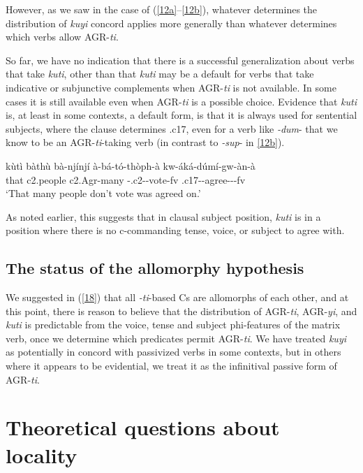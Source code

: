 \documentclass[output=paper,
modfonts
]{langscibook}
\begin{document}
However, as we saw in the case of (\ref{12a}--\ref{12b}), whatever determines the distribution of \textit{kuyi} concord applies more generally than whatever determines which verbs allow AGR-\textit{ti}.

So far, we have no indication that there is a successful generalization about verbs that take \textit{kuti}, other than that \textit{kuti} may be a default for verbs that take indicative or subjunctive complements when AGR-\textit{ti} is not available. In some cases it is still available even when AGR-\textit{ti} is a possible choice. Evidence that \textit{kuti} is, at least in some contexts, a default form, is that it is always used for sentential subjects, where the clause determines .c17, even for a verb like \textit{-dum}- that we know to be an AGR-\textit{ti}-taking verb (in contrast to \textit{-sup}- in \ref{12b}).

\ea\label{n23} \gll kùtì bàthù bà-njínjí à-bá-tó-thòph-à kw-áká-dúmí-gw-àn-à\\
      that c2.people c2.Agr-many -.c2--vote-fv .c17--agree---fv\\
	\glt `That many people don't vote was agreed on.' \z

As noted earlier, this suggests that in clausal subject position, \textit{kuti} is in a position where there is no c-commanding tense, voice, or subject to agree with.


\subsection{The status of the allomorphy hypothesis}

We suggested in (\ref{18}) that all \textit{-ti}-based Cs are allomorphs of each other, and at this point, there is reason to believe that the distribution of AGR-\textit{ti}, AGR-\textit{yi}, and \textit{kuti} is predictable from the voice, tense and subject phi-features of the matrix verb, once we determine which predicates permit AGR-\textit{ti}. We have treated \textit{kuyi} as potentially in concord with passivized verbs in some contexts, but in others where it appears to be evidential, we treat it as the infinitival passive form of AGR-\textit{ti}.

\section{Theoretical questions about locality}
\end{document}
